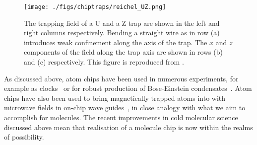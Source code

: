 \begin{figure}
  \centering
  \texttt{[image: ./figs/chiptraps/reichel\_UZ.png]}
  \caption{
  The trapping field of a U and a Z trap are shown in the left and right
  columns respectively. Bending a straight wire as in row (a) introduces weak
  confinement along the axis of the trap.  The $x$ and $z$ components of the
  field along the trap axis are shown in rows (b) and (c) respectively. This
  figure is reproduced from . 
  }
  \label{intro:fig:reichel_UZ}
\end{figure}

As discussed above, atom chips have been used in numerous experiments, for
example as clocks~\cite{RAMIREZMARTINEZ2011247} or for robust production of Bose-Einstein
condensates~\cite{Ott2001}. Atom chips have also been used to bring magnetically
trapped atoms into with microwave fields in on-chip wave
guides~\cite{Treutlein2008}, in close analogy with what we aim to accomplish
for molecules. The recent improvements in cold molecular science discussed
above mean that realisation of a molecule chip is now within the realms of
possibility.
